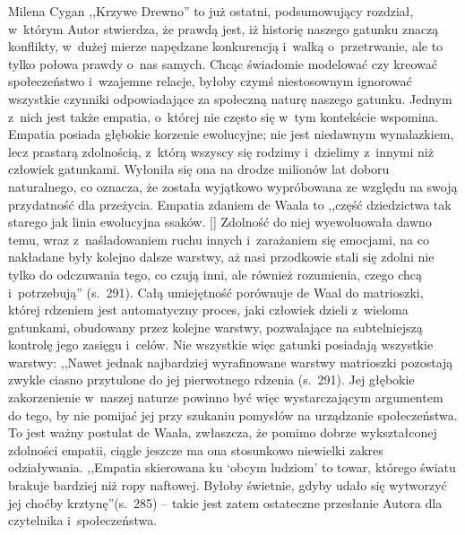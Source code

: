 \begin{recplenv}{Milena Cygan}
,,Krzywe Drewno'' to już ostatni, podsumowujący rozdział, w~którym Autor stwierdza, że prawdą jest, iż historię naszego
gatunku znaczą konflikty, w~dużej mierze napędzane konkurencją i~walką o~przetrwanie, ale to tylko połowa prawdy o~nas
samych. Chcąc świadomie modelować czy kreować społeczeństwo i~wzajemne relacje, byłoby czymś niestosownym ignorować
wszystkie czynniki odpowiadające za społeczną naturę naszego gatunku. Jednym z~nich jest także empatia, o~której nie
często się w~tym kontekście wspomina. Empatia posiada głębokie korzenie ewolucyjne; nie jest niedawnym wynalazkiem,
lecz prastarą zdolnością, z~którą wszyscy się rodzimy i~dzielimy z~innymi niż człowiek gatunkami. Wyłoniła się ona na
drodze milionów lat doboru naturalnego, co oznacza, że została wyjątkowo wypróbowana ze względu na swoją przydatność
dla przeżycia. Empatia zdaniem de Waala to ,,część dziedzictwa tak starego jak linia ewolucyjna ssaków. [\mydots] Zdolność do
niej wyewoluowała dawno temu, wraz z~naśladowaniem ruchu innych i~zarażaniem się emocjami, na co nakładane były kolejno
dalsze warstwy, aż nasi przodkowie stali się zdolni nie tylko do odczuwania tego, co czują inni, ale również
rozumienia, czego chcą i~potrzebują'' (s.~291). Całą umiejętność porównuje de Waal do matrioszki, której rdzeniem jest
automatyczny proces, jaki człowiek dzieli z~wieloma gatunkami, obudowany przez kolejne warstwy, pozwalające na
subtelniejszą kontrolę jego zasięgu i~celów. Nie wszystkie więc gatunki posiadają wszystkie warstwy: ,,Nawet jednak
najbardziej wyrafinowane warstwy matrioszki pozostają zwykle ciasno przytulone do jej pierwotnego rdzenia (s.~291). Jej
głębokie zakorzenienie w~naszej naturze powinno być więc wystarczającym argumentem do tego, by nie pomijać jej przy
szukaniu pomysłów na urządzanie społeczeństwa. To jest ważny postulat de Waala, zwłaszcza, że pomimo dobrze
wykształconej zdolności empatii, ciągle jeszcze ma ona stosunkowo niewielki zakres odziaływania. ,,Empatia skierowana ku
`obcym ludziom' to towar, którego światu brakuje bardziej niż ropy naftowej. Byłoby świetnie, gdyby udało się wytworzyć
jej choćby krztynę''(s.~285) -- takie jest zatem ostateczne przesłanie Autora dla czytelnika i~społeczeństwa.

\enlargethispage{-.5\baselineskip}


\end{recplenv}
